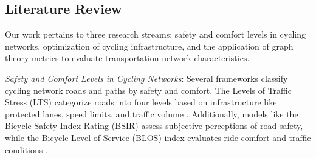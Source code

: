 \documentclass[lettersize,journal]{IEEEtran}
\begin{document}
\subsection{Literature Review} 
Our work pertains to three research streams: safety and comfort levels in cycling networks, optimization of cycling infrastructure, and the application of graph theory metrics to evaluate transportation network characteristics.




\textit{Safety and Comfort Levels in Cycling Networks}: Several frameworks classify cycling network roads and paths by safety and comfort. The Levels of Traffic Stress (LTS) categorize roads into four levels based on infrastructure like protected lanes, speed limits, and traffic volume \cite{crist2019fear}. Additionally, models like the Bicycle Safety Index Rating (BSIR) assess subjective perceptions of road safety, while the Bicycle Level of Service (BLOS) index evaluates ride comfort and traffic conditions \cite{bian2021categorizing, campisi2020cycling}.

\end{document}
